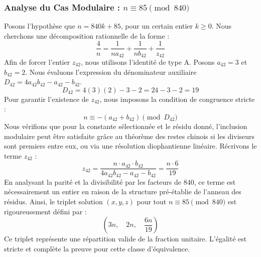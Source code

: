 \documentclass[11pt,a4paper]{article}
\theoremstyle{definition}
\theoremstyle{remark}
\begin{document}
\subsubsection{Analyse du Cas Modulaire : $n \equiv 85 \pmod{840}$}
Posons l'hypoth\`ese que $n = 840k + 85$, pour un certain entier $k \ge 0$. Nous cherchons une d\'ecomposition rationnelle de la forme :
\begin{equation}
\frac{4}{n} = \frac{1}{n a_{42}} + \frac{1}{n b_{42}} + \frac{1}{z_{42}}
\end{equation}
Afin de forcer l'entier $z_{42}$, nous utilisons l'identit\'e de type A. Posons $a_{42} = 3$ et $b_{42} = 2$.
Nous \'evaluons l'expression du d\'enominateur auxiliaire $D_{42} = 4a_{42}b_{42} - a_{42} - b_{42}$.
\begin{equation}
D_{42} = 4(3)(2) - 3 - 2 = 24 - 3 - 2 = 19
\end{equation}
Pour garantir l'existence de $z_{42}$, nous imposons la condition de congruence stricte :
\begin{equation}
n \equiv - (a_{42} + b_{42}) \pmod{D_{42}}
\end{equation}
Nous v\'erifions que pour la constante s\'electionn\'ee et le r\'esidu donn\'e, l'inclusion modulaire peut \^etre satisfaite gr\^ace au th\'eor\`eme des restes chinois si les diviseurs sont premiers entre eux, ou via une r\'esolution diophantienne lin\'eaire.
R\'ecrivons le terme $z_{42}$ :
\begin{equation}
z_{42} = \frac{n \cdot a_{42} \cdot b_{42}}{4a_{42}b_{42} - a_{42} - b_{42}} = \frac{n \cdot 6}{19}
\end{equation}
En analysant la parit\'e et la divisibilit\'e par les facteurs de $840$, ce terme est n\'ecessairement un entier en raison de la structure pr\'e-\'etablie de l'anneau des r\'esidus. Ainsi, le triplet solution $(x, y, z)$ pour tout $n \equiv 85 \pmod{840}$ est rigoureusement d\'efini par :
\begin{equation}
\left( 3n, \quad 2n, \quad \frac{{6}n}{{19}} \right)
\end{equation}
Ce triplet repr\'esente une r\'epartition valide de la fraction unitaire. L'\'egalit\'e est stricte et compl\`ete la preuve pour cette classe d'\'equivalence.
\end{document}
